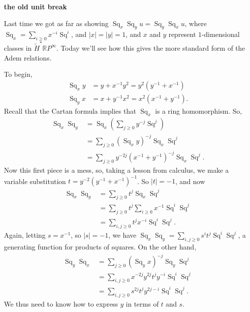 \documentclass{article}
\newcommand{\R}{\mathbb{R}}
\newcommand{\RP}{\R P}
\DeclareMathOperator{\Sq}{Sq}
\begin{document}
\textbf{the old unit break}

Last time we got as far as showing $\Sq_x \Sq_y u = \Sq_y \Sq_x u$, where $\Sq_x = \sum_{i \ge 0} x^{-i} \Sq^i$, and $|x| = |y| = 1$, and $x$ and $y$ represent $1$-dimensional classes in $\widetilde H^* \RP^\infty$. %
Today we'll see how this gives the more standard form of the Adem relations.

To begin,
\begin{align*}
\Sq_x y & = y + x^{-1} y^2 = y^2(y^{-1} + x^{-1}) \\
\Sq_y x & = x + y^{-1} x^2 = x^2(x^{-1} + y^{-1}).
\end{align*}
Recall that the Cartan formula implies that $\Sq_x$ is a ring homomorphism.  So,
\begin{align*}
\Sq_x \Sq_y & = \Sq_x \left( \sum_{j \ge 0} y^{-j} \Sq^j \right) \\
& = \sum_{j \ge 0}(\Sq_x y)^{-j} \Sq_x \Sq^j \\
& = \sum_{j \ge 0} y^{-2j}(x^{-1} + y^{-1})^{-j} \Sq_x \Sq^j.
\end{align*}
Now this first piece is a mess, so, taking a lesson from calculus, we make a variable substitution $t = y^{-2}(y^{-1} + x^{-1})^{-1}$.  So $|t| = -1$, and now
\begin{align*}
\Sq_x \Sq_y & = \sum_{j \ge 0} t^j \Sq_x \Sq^j \\
& = \sum_{j \ge 0} t^j \sum_{i \ge 0} x^{-1} \Sq^i \Sq^j \\
& = \sum_{i, j \ge 0} t^j x^{-i} \Sq^i \Sq^j.
\end{align*}
Again, letting $s = x^{-1}$, so $|s| = -1$, we have $\Sq_x \Sq_y = \sum_{i, j \ge 0} s^i t^j \Sq^i \Sq^j$, a generating function for products of squares.  On the other hand,
\begin{align*}
\Sq_y \Sq_x & = \sum_{j \ge 0}(\Sq_y x)^{-j} \Sq_y \Sq^j \\
& = \sum_{i, j \ge 0} x^{-2j} y^{2j} t^j y^{-i} \Sq^i \Sq^j \\
& = \sum_{i, j \ge 0} s^{2j} t^j y^{2j-i} \Sq^i \Sq^j.
\end{align*}
We thus need to know how to express $y$ in terms of $t$ and $s$.
\end{document}
